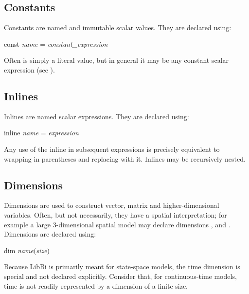 \subsection{Constants\label{Constants}}

Constants are named and immutable scalar values. They are declared using:
\begin{bicode}
const \emph{name} = \emph{constant_expression}
\end{bicode}
Often  is simply a literal value, but in
general it may be any constant scalar expression (see
).

\subsection{Inlines\label{Inlines}}

Inlines are named scalar expressions. They are declared using:
\begin{bicode}
inline \emph{name} = \emph{expression}
\end{bicode}
Any use of the inline  in subsequent expressions is
precisely equivalent to wrapping  in parentheses and
replacing  with it. Inlines may be recursively nested.

\subsection{Dimensions\label{Dimensions}}

 Dimensions are used to construct
vector, matrix and
higher-dimensional variables. Often, but not
necessarily, they have a spatial interpretation; for example a large
3-dimensional spatial model may declare dimensions
,  and . Dimensions are declared using:
\begin{bicode}
dim \emph{name}(\emph{size})
\end{bicode}

\begin{tip}
Because LibBi is primarily meant for state-space models, the time dimension is
special and not declared explicitly. Consider that, for continuous-time
models, time is not readily represented by a dimension of a finite size.
\end{tip}

